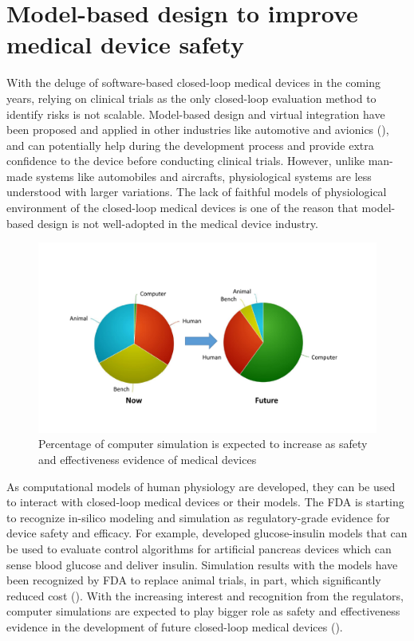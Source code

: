\section{Model-based design to improve medical device safety}
With the deluge of software-based closed-loop medical devices in the coming years, relying on clinical trials as the only closed-loop evaluation method to identify risks is not scalable. Model-based design and virtual integration have been proposed and applied in other industries like automotive and avionics (\cite{autosar, avsi}), and can potentially help during the development process and provide extra confidence to the device before conducting clinical trials. However, unlike man-made systems like automobiles and aircrafts, physiological systems are less understood with larger variations. The lack of faithful models of physiological environment of the closed-loop medical devices is one of the reason that model-based design is not well-adopted in the medical device industry. 
\begin{figure}[t]
		\centering
		\includegraphics[width=\textwidth]{figs/MDIC.pdf}
		\caption{\small Percentage of computer simulation is expected to increase as safety and effectiveness evidence of medical devices}
		\label{fig:MDIC}
\end{figure}

As computational models of human physiology are developed, they can be used to interact with closed-loop medical devices or their models. The FDA is starting to recognize in-silico modeling and simulation as regulatory-grade evidence for device safety and efficacy. For example, \cite{pancreas_paul} developed glucose-insulin models that can be used to evaluate control algorithms for artificial pancreas devices which can sense blood glucose and deliver insulin. Simulation results with the models have been recognized by FDA to replace animal trials, in part, which significantly reduced cost (\cite{pancreas}). With the increasing interest and recognition from the regulators, computer simulations are expected to play bigger role as safety and effectiveness evidence in the development of future closed-loop medical devices ().

